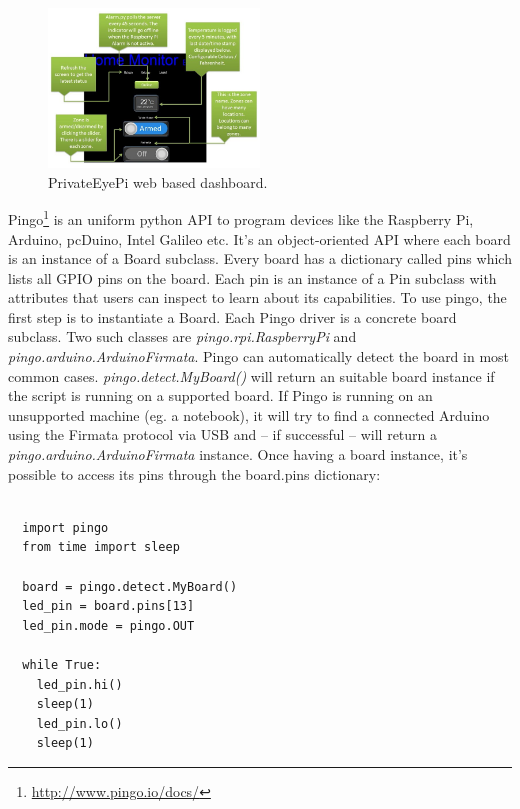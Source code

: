 \documentclass{acm_proc_article-sp}
\begin{document}
\begin{figure}[h]
\centering
    \includegraphics[width=0.5\textwidth,natwidth=610,natheight=642]{pictures/dashboardPrivateeye.png}
    \caption{PrivateEyePi web based dashboard.\protect\cite{Privateeyepi}}
    \label{fig:PrivateEye}
\end{figure}
\newline
\newline
Pingo\footnote{\url{http://www.pingo.io/docs/}} is an uniform python API to program devices like the Raspberry Pi, Arduino, pcDuino, Intel Galileo etc. It's an object-oriented API where each board is an instance of a Board subclass. Every board has a dictionary called pins which lists all GPIO pins on the board. Each pin is an instance of a Pin subclass with attributes that users can inspect to learn about its capabilities.
\newline
\newline
To use pingo, the first step is to instantiate a Board. Each Pingo driver is a concrete board subclass. Two such classes are \textit{pingo.rpi.RaspberryPi} and \textit{pingo.arduino.ArduinoFirmata}. Pingo can automatically detect the board in most common cases.  \textit{pingo.detect.MyBoard()} will return an suitable board instance if the script is running on a supported board. If Pingo is running on an unsupported machine (eg. a notebook), it will try to find a connected Arduino using the Firmata protocol via USB and – if successful – will return a \textit{pingo.arduino.ArduinoFirmata} instance.
\newline
\newline
Once having a board instance, it’s possible to access its pins through the board.pins dictionary:
\renewcommand{\theFancyVerbLine}{
  \sffamily\textcolor[rgb]{0.5,0.5,0.5}{\scriptsize\arabic{FancyVerbLine}}}
\begin{verbatim}

  import pingo
  from time import sleep

  board = pingo.detect.MyBoard()
  led_pin = board.pins[13]
  led_pin.mode = pingo.OUT

  while True:
    led_pin.hi()
    sleep(1)
    led_pin.lo()
    sleep(1)	
\end{verbatim}
\end{document}
